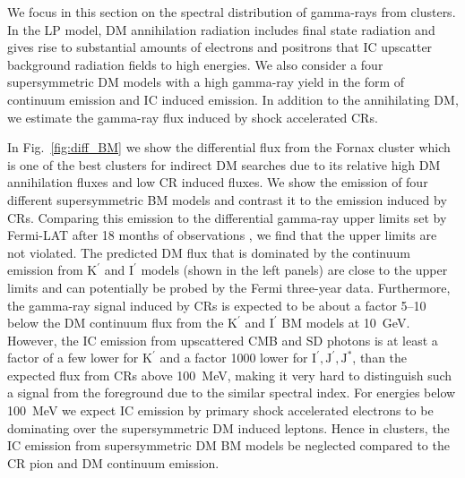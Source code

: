 \documentclass[10pt,aps,pra,reprint,amsmath,amsfonts,amssymb,showpacs,nofootinbib,floatfix]{revtex4-1}
\newcommand{\rmn}{\mathrm}
\newcommand{\Kp}{\rmn{K}^\prime}
\newcommand{\Ip}{\rmn{I}^\prime}
\newcommand{\Js}{\rmn{J}^*}
\newcommand{\Jp}{\rmn{J}^\prime}
\begin{document}
We focus in this section on the spectral distribution of gamma-rays
from clusters. In the LP model, DM annihilation radiation includes
final state radiation and gives rise to substantial amounts of
electrons and positrons that IC upscatter background radiation fields
to high energies. We also consider a four supersymmetric DM models with
a high gamma-ray yield in the form of continuum emission and IC
induced emission. In addition to the annihilating DM, we estimate the
gamma-ray flux induced by shock accelerated CRs.

In Fig.~\ref{fig:diff_BM} we show the differential flux from the
Fornax cluster which is one of the best clusters for indirect DM
searches due to its relative high DM annihilation fluxes and low CR induced
fluxes. We show the emission of four different supersymmetric BM
models and contrast it to the emission induced by CRs. Comparing this
emission to the differential gamma-ray upper limits set by Fermi-LAT
after 18 months of observations \cite{2010ApJ...717L..71A}, we find
that the upper limits are not violated. The predicted DM flux that is
dominated by the continuum emission from $\Kp$ and $\Ip$ models (shown
in the left panels) are close to the upper limits and can potentially
be probed by the Fermi three-year data. Furthermore, the gamma-ray
signal induced by CRs is expected to be about a factor 5--10 below the
DM continuum flux from the $\Kp$ and $\Ip$ BM models at
10~GeV. However, the IC emission from upscattered CMB and SD photons
is at least a factor of a few lower for $\Kp$ and a factor 1000 lower
for $\Ip,\Jp,\Js$, than the expected flux from CRs above 100~MeV,
making it very hard to distinguish such a signal from the foreground
due to the similar spectral index. For energies below 100~MeV we
expect IC emission by primary shock accelerated electrons to be
dominating \cite{2010MNRAS.409..449P} over the supersymmetric DM
induced leptons. Hence in clusters, the IC emission from
supersymmetric DM BM models be neglected compared to the CR pion and
DM continuum emission.
\end{document}
